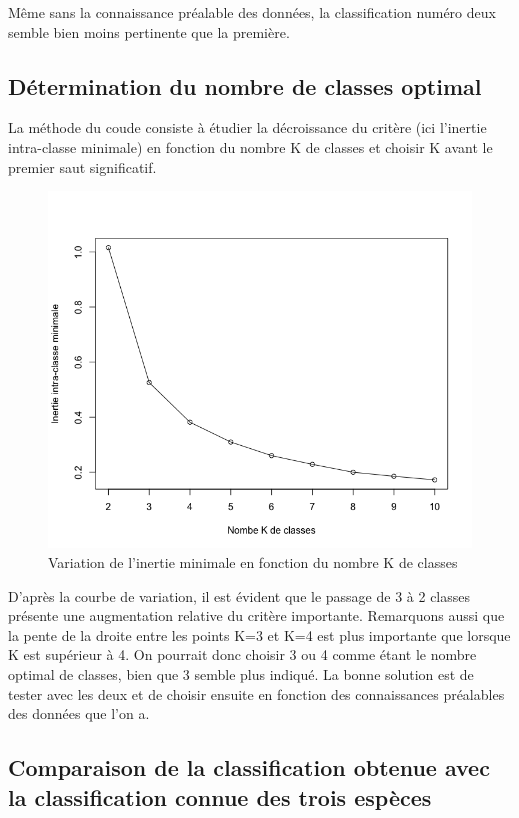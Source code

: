 \documentclass[a4paper,10pt]{report}
\begin{document}
Même sans la connaissance préalable des données, la classification numéro deux semble bien moins pertinente que la première.


\subsection{Détermination du nombre de classes optimal}

La méthode du coude consiste à étudier la décroissance du critère (ici l'inertie intra-classe minimale) en fonction du nombre K de classes et choisir K avant le premier saut significatif.

\begin{figure}[H]
	\centering
	\captionsetup{justification=centering, margin=4cm}
	\includegraphics[width=.5\linewidth]{img/3-1-3-variation-inertie-minimale-en-fonction-de-K}
	\caption{\small Variation de l'inertie minimale en fonction du nombre K de classes}
	\label{fig:3-1-3-variation-inertie-minimale-en-fonction-de-K}
\end{figure}

D'après la courbe de variation, il est évident que le passage de 3 à 2 classes présente une augmentation relative du critère importante. Remarquons aussi que la pente de la droite entre les points K=3 et K=4 est plus importante que lorsque K est supérieur à 4.
On pourrait donc choisir 3 ou 4 comme étant le nombre optimal de classes, bien que 3 semble plus indiqué. La bonne solution est de tester avec les deux et de choisir ensuite en fonction des connaissances préalables des données que l'on a.

\subsection{Comparaison de la classification obtenue avec la classification connue des trois espèces}
\end{document}
